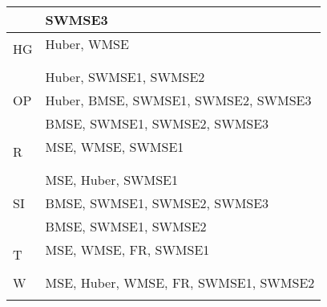 \documentclass[11pt, a4paper]{article}
\begin{document}
\begin{table}[H]
\begin{tabular}{ll}
                                      & SWMSE3                                         \\ \hline
\multirow{3}{*}{HG}                   & Huber, WMSE                                    \\
                                      &                                                \\
                                      &                                                \\ \hline
\multirow{3}{*}{OP}                   & Huber, SWMSE1, SWMSE2                          \\
                                      & Huber, BMSE, SWMSE1, SWMSE2, SWMSE3            \\
                                      & BMSE, SWMSE1, SWMSE2, SWMSE3                   \\ \hline
\multirow{3}{*}{R}                    & MSE, WMSE, SWMSE1                              \\
                                      &                                                \\
                                      &                                                \\ \hline
\multirow{3}{*}{SI}                   & MSE, Huber, SWMSE1                             \\
                                      & BMSE, SWMSE1, SWMSE2, SWMSE3                   \\
                                      & BMSE, SWMSE1, SWMSE2                           \\ \hline
\multirow{3}{*}{T}                    & MSE, WMSE, FR, SWMSE1                          \\
                                      &                                                \\
                                      &                                                \\ \hline
W                                     & MSE, Huber, WMSE, FR, SWMSE1, SWMSE2           \\
                                      &
\end{tabular}
\end{table}
\end{document}
